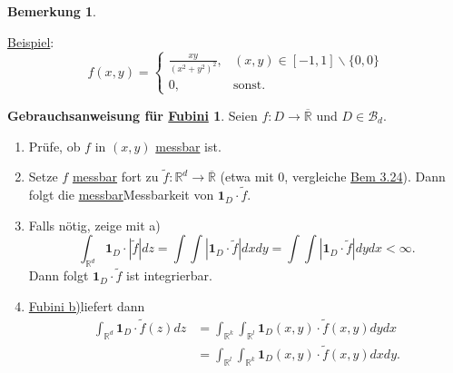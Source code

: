 \documentclass[a4paper]{scrreprt}
\newcommand{\doubleOne}{\textbf{1}}
\newcommand{\R}{\mathbb{R}}
\newcommand{\Rq}{\overline{\R}}
\newcommand{\Borel}{\mathcal{B}}
\newcommand{\Bd}{\Borel_d}
\newcommand{\jemph}{\uline}
\newcommand{\jhyperref}[2]{\hyperref[j_#1]{#2}}
\newcommand{\jlink}[1]{\jhyperref{#1}{#1}}
\newcommand{\jabb}[3]{ #1: #2 \rightarrow #3 }
\newcommand{\jlinkFubiniB}{\jhyperref{FubiniB}{Fubini b)}}
\newcommand{\jspacesmall}{\vspace{4pt}}
\theoremstyle{plain}
\theoremstyle{definition}
\newtheorem{bem}[thm]{Bemerkung}
\newtheorem*{gebrauchsanweisungFubini}{Gebrauchsanweisung für \jlink{Fubini}}
\begin{document}
{{{{\begin{bem}
\begin{enumerate}
            \jspacesmall
            
            \jemph{Beispiel}:
            \begin{displaymath}
                f(x,y) = \begin{cases}
                             \frac{xy}{(x^2+y^2)^2}, &(x,y) \in [-1,1]\backslash \{0,0\}\\
                             0, & \text{sonst}.
                         \end{cases}
            \end{displaymath}
    \end{enumerate}
\end{bem}

\begin{gebrauchsanweisungFubini}
    Seien $\jabb{f}{D}{\Rq}$ und $D\in \Bd$.
    \begin{enumerate}
        \item Prüfe, ob $f$ in $(x,y)$ \jlink{messbar} ist.
        \item Setze $f$ \jlink{messbar} fort zu $\jabb{\tilde{f}}{\R^d}{\Rq}$ (etwa mit $0$, vergleiche \jlink{Bem 3.24}). Dann folgt die \jlink{messbar}{Messbarkeit} von $\doubleOne_D\cdot \tilde{f}$.
        \item
            Falls nötig, zeige mit a)
            \begin{displaymath}
                \int_{\R^d} \doubleOne_D\cdot |\tilde{f}| dz = \int \int |\doubleOne_D \cdot \tilde{f}| dxdy = \int \int |\doubleOne_D \cdot \tilde{f}| dydx < \infty.
            \end{displaymath}
            Dann folgt $\doubleOne_D\cdot \tilde{f}$ ist integrierbar.
        \item
            \jlinkFubiniB liefert dann
            \begin{displaymath}
                \begin{split}
                    \int_{\R^d} \doubleOne_D\cdot \tilde{f}(z)dz &= \int_{\R^k}\int_{\R^l} \doubleOne_D(x,y) \cdot \tilde{f}(x,y)dydx\\
                    &= \int_{\R^l}\int_{\R^k} \doubleOne_D(x,y) \cdot \tilde{f}(x,y)dxdy.
                \end{split}
            \end{displaymath}
    \end{enumerate}
\end{gebrauchsanweisungFubini}

}}}}
\end{document}

